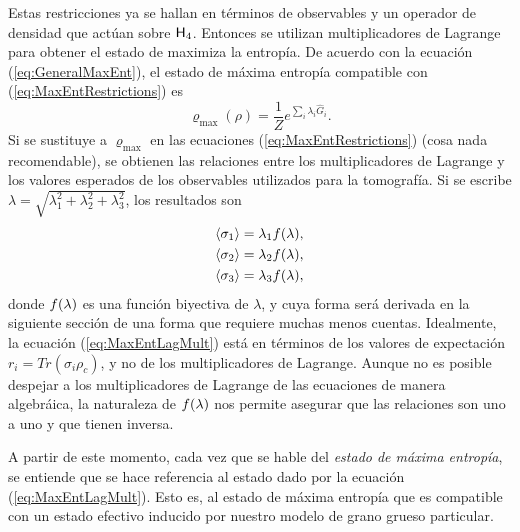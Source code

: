 Estas restricciones ya se hallan en términos de observables y un operador de densidad que actúan sobre ${\sf H}_{4}$. Entonces se utilizan multiplicadores de Lagrange para obtener el estado de maximiza la entropía. De acuerdo con la ecuación (\ref{eq:GeneralMaxEnt}), el estado de máxima entropía compatible con (\ref{eq:MaxEntRestrictions}) es
\begin{equation}\label{eq:MaxEntLagMult}
    \varrho_{\max}(\rho)=\frac{1}{Z}e^{\sum_{i}\lambda_{i}\hat{G}_{i}}.
\end{equation}
Si se sustituye a $\varrho_{\max}$ en las ecuaciones (\ref{eq:MaxEntRestrictions}) (cosa nada recomendable), se obtienen las relaciones entre los multiplicadores de Lagrange y los valores esperados de los observables utilizados para la tomografía. Si se escribe $\lambda=\sqrt{\lambda_{1}^{2}+\lambda_{2}^{2}+\lambda_{3}^{2}}$, los resultados son
\begin{align}\label{eq:MaxEntExpVals}
    \begin{split}
    \expval{\sigma_{1}}&=\lambda_{1}f(\lambda),\\
    \expval{\sigma_{2}}&=\lambda_{2}f(\lambda),\\
    \expval{\sigma_{3}}&=\lambda_{3}f(\lambda),
    \end{split}
\end{align}
donde $f(\lambda)$ es una función biyectiva de $\lambda$, y cuya forma será derivada en la siguiente sección de una forma que requiere muchas menos cuentas. Idealmente, la ecuación (\ref{eq:MaxEntLagMult}) está en términos de los valores de expectación $r_{i}=Tr(\sigma_{i}\rho_{c})$, y no de los multiplicadores de Lagrange. Aunque no es posible despejar a los multiplicadores de Lagrange de las ecuaciones de manera algebráica, la naturaleza de $f(\lambda)$ nos permite asegurar que las relaciones son uno a uno y que tienen inversa.

A partir de este momento, cada vez que se hable del \textit{estado de máxima entropía}, se entiende que se hace referencia al estado dado por la ecuación (\ref{eq:MaxEntLagMult}). Esto es, al estado de máxima entropía que es compatible con un estado efectivo inducido por nuestro modelo de grano grueso particular.